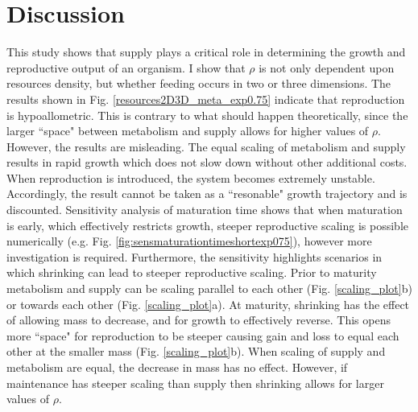 \documentclass[a4paper, 11pt, hidelinks]{article} %
\begin{document}
\section{Discussion}
	\linenumbers
	This study shows that supply plays a critical role in determining the growth and reproductive output of an organism.  I show that $ \rho $ is not only dependent upon resources density, but whether feeding occurs in two or three dimensions.  
	The results shown in Fig. \ref{resources2D3D_meta_exp0.75} indicate that reproduction is hypoallometric.  This is contrary to what should happen theoretically, since the larger ``space" between metabolism and supply allows for higher values of $ \rho $. However, the results are misleading.  The equal scaling of metabolism and supply results in rapid growth which does not slow down without other additional costs.  When reproduction is introduced, the system becomes extremely unstable.  Accordingly, the result cannot be taken as a ``resonable" growth trajectory and is discounted.  Sensitivity analysis of maturation time shows that when maturation is early, which effectively restricts growth, steeper reproductive scaling is possible numerically (e.g. Fig. \ref{fig:sensmaturationtimeshortexp075}), however more investigation is required.
%	
%	
	Furthermore, the sensitivity highlights scenarios in which shrinking can lead to steeper reproductive scaling.  Prior to maturity metabolism and supply can be scaling parallel to each other (Fig. \ref{scaling_plot}b) or towards each other (Fig. \ref{scaling_plot}a).  At maturity, shrinking has the effect of allowing mass to decrease, and for growth to effectively reverse.  This opens more ``space" for reproduction to be steeper causing gain and loss to equal each other at the smaller mass (Fig. \ref{scaling_plot}b).  When scaling of supply and metabolism are equal, the decrease in mass has no effect. However, if maintenance has steeper scaling than supply then shrinking allows for larger values of $ \rho $.
\end{document}
